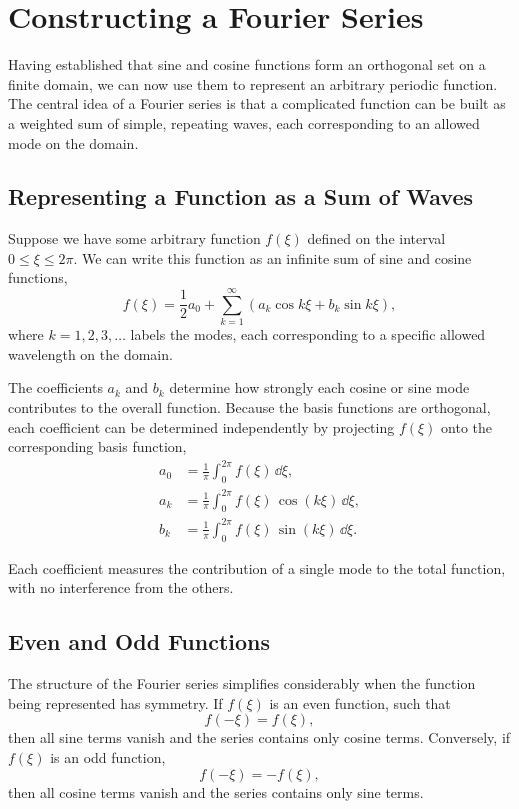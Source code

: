 \section{Constructing a Fourier Series}

Having established that sine and cosine functions form an orthogonal set on a finite domain, we can now use them to represent an arbitrary periodic function. The central idea of a Fourier series is that a complicated function can be built as a weighted sum of simple, repeating waves, each corresponding to an allowed mode on the domain.

\subsection{Representing a Function as a Sum of Waves}

Suppose we have some arbitrary function $f(\xi)$ defined on the interval $0 \le \xi \le 2\pi$. We can write this function as an infinite sum of sine and cosine functions,
\begin{equation}
    f(\xi) = \frac{1}{2} a_0 + \sum_{k = 1}^\infty 
    \left( a_k \cos k \xi + b_k \sin k \xi \right),
\end{equation}
where $k = 1, 2, 3, \ldots$ labels the modes, each corresponding to a specific allowed wavelength on the domain.

The coefficients $a_k$ and $b_k$ determine how strongly each cosine or sine mode contributes to the overall function. Because the basis functions are orthogonal, each coefficient can be determined independently by projecting $f(\xi)$ onto the corresponding basis function,
\begin{align}
    a_0 &= \frac{1}{\pi} \int_{0}^{2\pi} f(\xi)\, \dd{\xi}, \\
    a_k &= \frac{1}{\pi} \int_{0}^{2\pi} f(\xi)\, \cos(k \xi)\, \dd{\xi}, \\
    b_k &= \frac{1}{\pi} \int_{0}^{2\pi} f(\xi)\, \sin(k \xi)\, \dd{\xi}.
\end{align}

Each coefficient measures the contribution of a single mode to the total function, with no interference from the others.

\subsection{Even and Odd Functions}

The structure of the Fourier series simplifies considerably when the function being represented has symmetry. If $f(\xi)$ is an even function, such that
\begin{equation}
    f(-\xi) = f(\xi),
\end{equation}
then all sine terms vanish and the series contains only cosine terms. Conversely, if $f(\xi)$ is an odd function,
\begin{equation}
    f(-\xi) = -f(\xi),
\end{equation}
then all cosine terms vanish and the series contains only sine terms.


